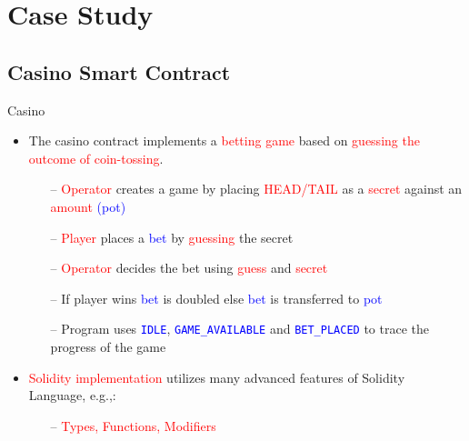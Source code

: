 \documentclass[aspectratio=169]{beamer}
\begin{document}
\section{Case Study}

\subsection{Casino Smart Contract}
%
\begin{frame}{Casino}
\begin{itemize}

\item The casino contract implements a \textcolor{red}{betting game} based on \textcolor{red}{guessing  the outcome of coin-tossing}.
\begin{itemize}
\item[--] \textcolor{red}{Operator} creates a game by placing \textcolor{red}{HEAD/TAIL} as a \textcolor{red}{ secret} against an \textcolor{red}{ amount} \textcolor{blue}{ (pot)}
\item[--] \textcolor{red}{Player} places a \textcolor{blue}{ bet} by \textcolor{red}{guessing} the secret 
\item[--] \textcolor{red}{Operator} decides the bet using \textcolor{red}{guess} and \textcolor{red}{secret}
\item[--] If player wins \textcolor{blue}{ bet} is doubled else \textcolor{blue}{bet} is transferred to \textcolor{blue}{pot}
\item [--] Program uses \texttt{\textcolor{blue}{IDLE}}, \texttt{\textcolor{blue}{GAME\_AVAILABLE}} and \texttt{\textcolor{blue}{BET\_PLACED}} to trace the progress of the game
\end{itemize}
\item \textcolor{red}{Solidity  implementation} utilizes many advanced features of Solidity Language, e.g.,:
\begin{itemize}
\item[--] \textcolor{red}{Types, Functions, Modifiers }
\end{itemize}
\end{itemize}
\end{frame}
\end{document}
